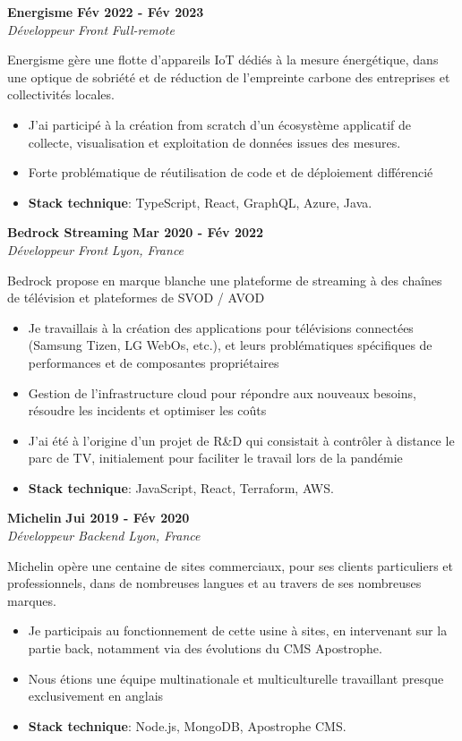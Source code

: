 \documentclass[11pt]{article}
\newcommand{\experience}[4]{%
  \vspace{5pt}
  \textbf{#2} \hfill \textbf{#3} \\
  \textit{#1} \hfill \textit{#4} \\
  \vspace{-10pt}
}
\begin{document}
\experience{Développeur Front}{Energisme}{Fév 2022 - Fév 2023}{Full-remote}

Energisme gère une flotte d'appareils IoT dédiés à la mesure énergétique, dans une optique de sobriété et de réduction de l'empreinte carbone des entreprises et collectivités locales.

\begin{itemize}
    \item J'ai participé à la création from scratch d'un écosystème applicatif de collecte, visualisation et exploitation de données issues des mesures.
    \item Forte problématique de réutilisation de code et de déploiement différencié
    \item \textbf{Stack technique}: TypeScript, React, GraphQL, Azure, Java.
\end{itemize}

\experience{Développeur Front}{Bedrock Streaming}{Mar 2020 - Fév 2022}{Lyon, France}

Bedrock propose en marque blanche une plateforme de streaming à des chaînes de télévision et plateformes de SVOD / AVOD

\begin{itemize}
    \item Je travaillais à la création des applications pour télévisions connectées (Samsung Tizen, LG WebOs, etc.), et leurs problématiques spécifiques de performances et de composantes propriétaires
    \item Gestion de l'infrastructure cloud pour répondre aux nouveaux besoins, résoudre les incidents et optimiser les coûts
    \item J'ai été à l'origine d'un projet de R\&D qui consistait à contrôler à distance le parc de TV, initialement pour faciliter le travail lors de la pandémie
    \item \textbf{Stack technique}: JavaScript, React, Terraform, AWS.
\end{itemize}


\experience{Développeur Backend}{Michelin}{Jui 2019 - Fév 2020}{Lyon, France}

Michelin opère une centaine de sites commerciaux, pour ses clients particuliers et professionnels, dans de nombreuses langues et au travers de ses nombreuses marques.

\begin{itemize}
    \item Je participais au fonctionnement de cette usine à sites, en intervenant sur la partie back, notamment via des évolutions du CMS Apostrophe.
    \item Nous étions une équipe multinationale et multiculturelle travaillant presque exclusivement en anglais
    \item \textbf{Stack technique}: Node.js, MongoDB, Apostrophe CMS.
\end{itemize}
\end{document}
